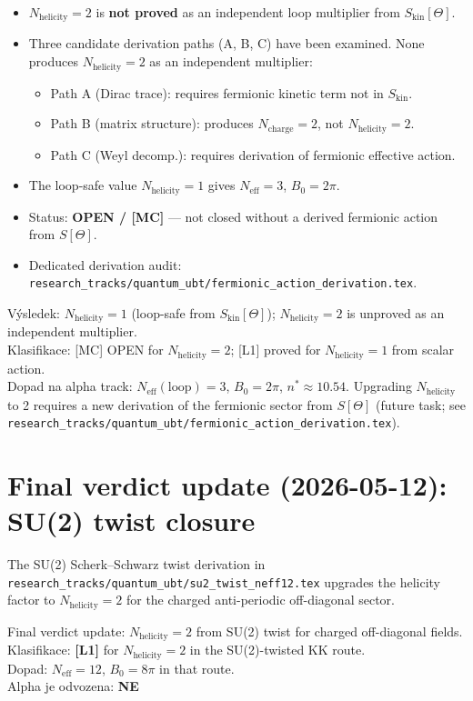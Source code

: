 \documentclass[12pt,a4paper]{article}
\theoremstyle{remark}
\newcommand{\Neff}{N_{\mathrm{eff}}}
\newcommand{\Nhelicity}{N_{\mathrm{helicity}}}
\newcommand{\Ncharge}{N_{\mathrm{charge}}}
\begin{document}
\begin{itemize}
  \item $\Nhelicity = 2$ is \textbf{not proved} as an independent loop multiplier
        from $S_{\mathrm{kin}}[\Theta]$.
  \item Three candidate derivation paths (A, B, C) have been examined.  None
        produces $\Nhelicity = 2$ as an independent multiplier:
        \begin{itemize}
          \item Path A (Dirac trace): requires fermionic kinetic term not in $S_{\mathrm{kin}}$.
          \item Path B (matrix structure): produces $\Ncharge = 2$, not $\Nhelicity = 2$.
          \item Path C (Weyl decomp.): requires derivation of fermionic effective action.
        \end{itemize}
  \item The loop-safe value $\Nhelicity = 1$ gives $\Neff = 3$, $B_0 = 2\pi$.
  \item Status: \textbf{OPEN / [MC]} — not closed without a derived fermionic
        action from $S[\Theta]$.
  \item Dedicated derivation audit:
        \texttt{research\_tracks/quantum\_ubt/fermionic\_action\_derivation.tex}.
\end{itemize}

\begin{statusbox}
Výsledek: $\Nhelicity = 1$ (loop-safe from $S_{\mathrm{kin}}[\Theta]$);
$\Nhelicity = 2$ is unproved as an independent multiplier.\\
Klasifikace: [MC] OPEN for $\Nhelicity = 2$; [L1] proved for $\Nhelicity = 1$
  from scalar action.\\
Dopad na alpha track: $\Neff(\mathrm{loop}) = 3$, $B_0 = 2\pi$, $n^*\approx 10.54$.
Upgrading $\Nhelicity$ to 2 requires a new derivation of the fermionic
sector from $S[\Theta]$ (future task; see
\texttt{research\_tracks/quantum\_ubt/fermionic\_action\_derivation.tex}).
\end{statusbox}


\section{Final verdict update (2026-05-12): SU(2) twist closure}
\label{sec:su2-update}
The SU(2) Scherk--Schwarz twist derivation in
\texttt{research\_tracks/quantum\_ubt/su2\_twist\_neff12.tex}
upgrades the helicity factor to
\(N_{\mathrm{helicity}}=2\) for the charged anti-periodic off-diagonal sector.

\begin{statusbox}
Final verdict update: \(N_{\mathrm{helicity}}=2\) from SU(2) twist for charged off-diagonal fields.\\
Klasifikace: \textbf{[L1]} for \(N_{\mathrm{helicity}}=2\) in the SU(2)-twisted KK route.\\
Dopad: \(N_{\mathrm{eff}}=12\), \(B_0=8\pi\) in that route.\\
Alpha je odvozena: \textbf{NE}
\end{statusbox}
\end{document}
